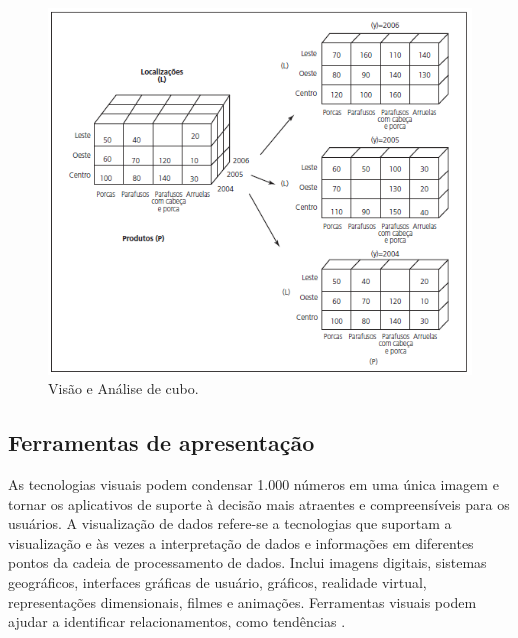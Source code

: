 \begin{figure}[htb]
	\caption{\label{fig_cuboturban}Visão e Análise de cubo.}
	\begin{center}
	    \includegraphics[scale=1]{Imagens/figura - cubo olap turban.png}
	\end{center}
\end{figure}
\subsection{Ferramentas de apresentação} \label{subD-relatorios}
As tecnologias visuais podem condensar 1.000 números em uma única imagem e tornar os aplicativos de suporte à decisão mais atraentes e compreensíveis para os usuários. A visualização de dados refere-se a tecnologias que suportam a visualização e às vezes a interpretação de dados e informações em diferentes pontos da cadeia de processamento de dados. Inclui imagens digitais, sistemas geográficos, interfaces gráficas de usuário, gráficos, realidade virtual, representações dimensionais, filmes e animações. Ferramentas visuais podem ajudar a identificar relacionamentos, como tendências \cite{turban2008}.
